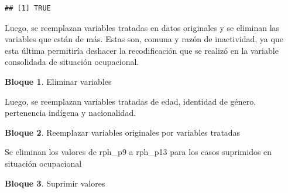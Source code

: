 \documentclass[]{book}
\newenvironment{Shaded}{\begin{snugshade}}{\end{snugshade}}
\newcommand{\NormalTok}[1]{#1}
\newcommand{\OperatorTok}[1]{\textcolor[rgb]{0.81,0.36,0.00}{\textbf{#1}}}
\newcommand{\OtherTok}[1]{\textcolor[rgb]{0.56,0.35,0.01}{#1}}
\newcommand{\StringTok}[1]{\textcolor[rgb]{0.31,0.60,0.02}{#1}}
\theoremstyle{definition}
\theoremstyle{definition}
\newtheorem{example}{Bloque}[chapter]
\theoremstyle{definition}
\theoremstyle{definition}
\theoremstyle{remark}
\begin{document}
\begin{verbatim}
## [1] TRUE
\end{verbatim}

Luego, se reemplazan variables tratadas en datos originales y se eliminan las variables que están de más. Estas son, comuna y razón de inactividad, ya que esta última permitiría deshacer la recodificación que se realizó en la variable consolidada de situación ocupacional.

\begin{example}
\protect\hypertarget{exm:bloque93nbm}{}{\label{exm:bloque93nbm} }Eliminar variables
\end{example}

\begin{Shaded}
\end{Shaded}

Luego, se reemplazan variables tratadas de edad, identidad de género, pertenencia indígena y nacionalidad.

\begin{example}
\protect\hypertarget{exm:bloque94nbm}{}{\label{exm:bloque94nbm} }Reemplazar variables originales por variables tratadas
\end{example}

\begin{Shaded}
\end{Shaded}

Se eliminan los valores de rph\_p9 a rph\_p13 para los casos suprimidos en situación ocupacional

\begin{example}
\protect\hypertarget{exm:bloque95nbm}{}{\label{exm:bloque95nbm} }Suprimir valores
\end{example}
\end{document}
